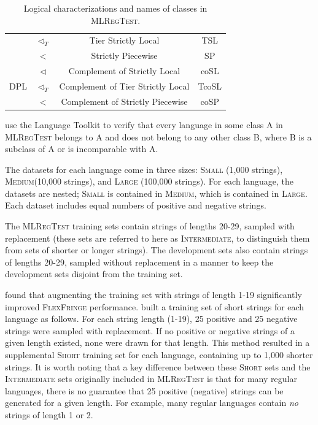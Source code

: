 \documentclass[twoside,11pt]{article}
\newcommand{\tscx}[1]{\textsc{#1}\xspace}
\newcommand{\sm}{\tscx{Small}}
\newcommand{\med}{\tscx{Medium}}
\newcommand{\lrg}{\tscx{Large}}
\newcommand{\short}{\tscx{Short}}
\newcommand{\orig}{\tscx{Intermediate}}
\begin{document}
\begin{table}[!t]
\begin{tabular}{cccc}
                          & $\triangleleft_T$    & Tier Strictly Local               & TSL                  \\
                          & $<$                  & Strictly Piecewise                & SP                   \\
    \midrule
    \multirow{3}{*}{DPL}  & $\triangleleft$      & Complement of Strictly Local      & coSL                 \\
                          & $\triangleleft_T$    & Complement of Tier Strictly Local & TcoSL                \\
                          & $<$                  & Complement of Strictly Piecewise  & coSP                 \\
    \bottomrule
  \end{tabular}
  \caption{Logical characterizations and names of classes in \textsc{MLRegTest}.}
  \label{tab:classes}
\end{table}

 use the Language Toolkit \citep{Lambert2024} to
verify that every language in some class A in \textsc{MLRegTest} belongs to A
and does not belong to any other class B, where B is a subclass of A
or is incomparable with A.

The datasets for each language come in three sizes: \sm
(1,000 strings), \med (10,000 strings), and \lrg
(100,000 strings). For each language, the datasets are nested;
\textsc{Small} is contained in \textsc{Medium}, which is contained in
\textsc{Large}. Each dataset includes equal numbers of positive and
negative strings.

The \textsc{MLRegTest} training sets contain strings of lengths 20-29, sampled with
replacement (these sets are referred to here as \orig, to distinguish them from sets of shorter or longer strings). 
The development sets also contain strings of lengths
20-29, sampled without replacement in a manner to keep the development
sets disjoint from the training set.
 
\citeauthor{adil23} found that augmenting the training set with strings of length 1-19 significantly improved \textsc{FlexFringe} performance.
\citeauthor{adil23} built a training set of short strings for each language as
follows. 
For each string length (1-19), 25 positive and 25 negative strings were
sampled with replacement.
If no positive or negative strings of a given length existed, none were drawn for that length.
This method resulted in a supplemental \short training set for each language, containing up to 1,000 shorter strings.
It is worth noting that a key difference between these \short sets and the \orig sets originally included in \textsc{MLRegTest} is that for many regular languages, there is no guarantee that 25 positive (negative) strings can be generated for a given length.
For example, many regular languages contain \emph{no} strings of length 1 or 2.
\end{document}
